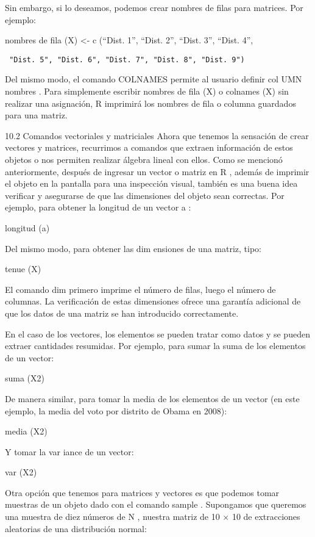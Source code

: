 \documentclass[
]{book}
\begin{document}
Sin embargo, si lo deseamos, podemos crear nombres de filas para matrices. Por ejemplo:

nombres de fila (X) \textless- c (``Dist. 1'', ``Dist. 2'', ``Dist. 3'', ``Dist. 4'',

\begin{verbatim}
 "Dist. 5", "Dist. 6", "Dist. 7", "Dist. 8", "Dist. 9")
\end{verbatim}

Del mismo modo, el comando COLNAMES permite al usuario definir col UMN nombres . Para simplemente escribir nombres de fila (X) o colnames (X) sin realizar una asignación, R imprimirá los nombres de fila o columna guardados para una matriz.

10.2 Comandos vectoriales y matriciales
Ahora que tenemos la sensación de crear vectores y matrices, recurrimos a comandos que extraen información de estos objetos o nos permiten realizar álgebra lineal con ellos. Como se mencionó anteriormente, después de ingresar un vector o matriz en R , además de imprimir el objeto en la pantalla para una inspección visual, también es una buena idea verificar y asegurarse de que las dimensiones del objeto sean correctas. Por ejemplo, para obtener la longitud de un vector a :

longitud (a)

Del mismo modo, para obtener las dim ensiones de una matriz, tipo:

tenue (X)

El comando dim primero imprime el número de filas, luego el número de columnas. La verificación de estas dimensiones ofrece una garantía adicional de que los datos de una matriz se han introducido correctamente.

En el caso de los vectores, los elementos se pueden tratar como datos y se pueden extraer cantidades resumidas. Por ejemplo, para sumar la suma de los elementos de un vector:

suma (X2)

De manera similar, para tomar la media de los elementos de un vector (en este ejemplo, la media del voto por distrito de Obama en 2008):

media (X2)

Y tomar la var iance de un vector:

var (X2)

Otra opción que tenemos para matrices y vectores es que podemos tomar muestras de un objeto dado con el comando sample . Supongamos que queremos una muestra de diez números de N , nuestra matriz de 10 × 10 de extracciones aleatorias de una distribución normal:
\end{document}
